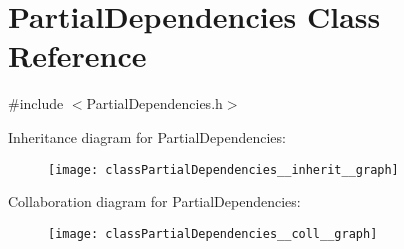 \hypertarget{classPartialDependencies}{}\section{Partial\+Dependencies Class Reference}
\label{classPartialDependencies}


{\ttfamily \#include $<$Partial\+Dependencies.\+h$>$}



Inheritance diagram for Partial\+Dependencies\+:\nopagebreak
\begin{figure}[H]
\begin{center}
\leavevmode
\texttt{[image: classPartialDependencies\_\_inherit\_\_graph]}
\end{center}
\end{figure}


Collaboration diagram for Partial\+Dependencies\+:\nopagebreak
\begin{figure}[H]
\begin{center}
\leavevmode
\texttt{[image: classPartialDependencies\_\_coll\_\_graph]}
\end{center}
\end{figure}
